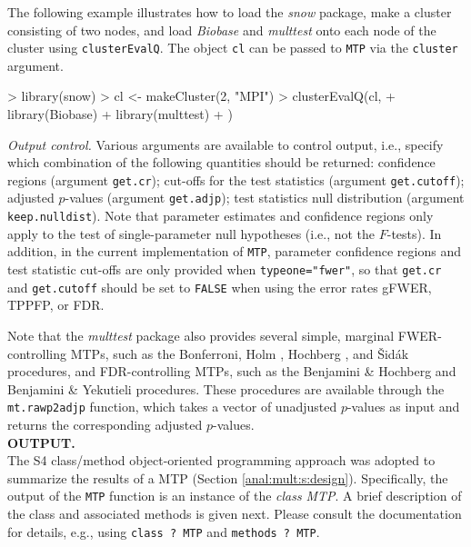 \documentclass[11pt]{article}
\newcommand{\Rpackage}[1]{\textit{#1}}
\newcommand{\Robject}[1]{\texttt{#1}}
\newcommand{\Rclass}[1]{\textit{#1}}
\begin{document}
\begin{description}
The following example illustrates how to load the \Rpackage{snow} package, make a cluster consisting 
of two nodes, and load \Rpackage{Biobase} and \Rpackage{multtest} onto each node of the 
cluster using \Robject{clusterEvalQ}. The object \Robject{cl} can be passed to \Robject{MTP} via
the \Robject{cluster} argument. 

\begin{Schunk}
\begin{Sinput}
> library(snow)
> cl <- makeCluster(2, "MPI")
> clusterEvalQ(cl, {
+     library(Biobase)
+     library(multtest)
+ })
\end{Sinput}
\end{Schunk}

\item{\em Output control.} 
Various arguments are available to control output, i.e., specify which combination of the following quantities should be returned: 
confidence regions (argument \Robject{get.cr}); 
cut-offs for the test statistics (argument \Robject{get.cutoff}); 
adjusted $p$-values (argument \Robject{get.adjp}); 
test statistics null distribution  (argument \Robject{keep.nulldist}). 
Note that parameter estimates and confidence regions only apply to the test of single-parameter null hypotheses (i.e., not the $F$-tests). 
In addition, in the current implementation of \Robject{MTP}, parameter confidence regions and test statistic cut-offs are only provided when \texttt{typeone="fwer"}, so that \Robject{get.cr} and \Robject{get.cutoff} should be set to \Robject{FALSE} when using the error rates gFWER, TPPFP, or FDR.


\end{description}

Note that the \Rpackage{multtest} package also provides several simple, marginal FWER-controlling MTPs, such as the Bonferroni, Holm \cite{Holm79}, Hochberg \cite{Hochberg88}, and \v{S}id\'{a}k \cite{Sidak67} procedures, and FDR-controlling MTPs, such as the Benjamini \& Hochberg \cite{Benjamini&Hochberg95} and Benjamini \& Yekutieli \cite{Benjamini&Yekutieli01} procedures. 
These procedures are available through the \Robject{mt.rawp2adjp} function, which takes a vector of unadjusted $p$-values as input and returns the corresponding adjusted $p$-values.\\


\noindent
{\bf  OUTPUT.}\\


The S4 class/method object-oriented programming approach was adopted to summarize the results of a MTP (Section \ref{anal:mult:s:design}). 
Specifically, the output of the \Robject{MTP} function is an instance of the {\em class} \Rclass{MTP}. 
A brief description of the class and associated methods is given next. Please consult the documentation for details, e.g., using \texttt{class ? MTP} and \texttt{methods ? MTP}. 
\end{document}
